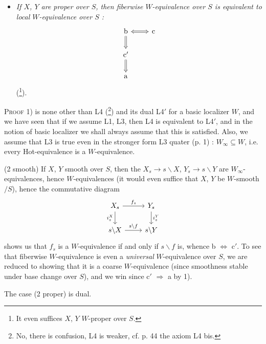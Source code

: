 \documentclass[11pt]{article}
\newcommand{\printedpage}[1]{\marginpar{\footnotesize p.~#1}}
\begin{document}
\begin{itemize}
\printedpage{26}
(\footnote[23]{it even suffices $X$, $Y$ $W$-smooth over $S$.}).

\item[(2 prop)] \textit{If $X$, $Y$ are proper over $S$, then fiberwise $W$-equivalence over $S$ is equivalent to local $W$-equivalence over $S$ :}
\[
\begin{tikzcd}
\text{b} \arrow[r, Leftrightarrow] \arrow[d, Rightarrow] & \text{c} \\
\text{c}' \arrow[d, Rightarrow] & \\
\text{a} &
\end{tikzcd}
\]
(\footnote[24]{It even suffices $X$, $Y$ $W$-proper over $S$.}).
\end{itemize}

\textsc{Proof} 1) is none other than L4 (\footnote[25]{No, there is confusion, L4 is weaker, cf. p. 44 the axiom L4 bis.}) and its dual L4$'$ for a basic localizer $W$, and we have seen that if we assume L1, L3, then L4 is equivalent to L4$'$, and in the notion of basic localizer we shall always assume that this is satisfied. Also, we assume that L3 is true even in the stronger form L3 quater (p. 1) : $W_\infty \subseteq W$, i.e. every Hot-equivalence is a $W$-equivalence.

(2 smooth) If $X$, $Y$ smooth over $S$, then the $X_s \longrightarrow s\backslash X$, $Y_s \longrightarrow s\backslash Y$ are $W_\infty$-equivalences, hence $W$-equivalences (it would even suffice that $X$, $Y$ be $W$-smooth$/S$), hence the commutative diagram
\[
\begin{tikzcd}
X_s \arrow[r, "f_s"] \arrow[d, "i_s^X"'] & Y_s \arrow[d, "i_s^Y"] \\
s\backslash X \arrow[r, "s\backslash f"] & s\backslash Y
\end{tikzcd}
\]
shows us that $f_s$ is a $W$-equivalence if and only if $s\backslash f$ is, whence b $\Longleftrightarrow$ c$'$. To see that fiberwise $W$-equivalence is even a \textit{universal} $W$-equivalence over $S$, we are reduced to showing that it is a coarse $W$-equivalence (since smoothness stable under base change over $S$), and we win since c$'$ $\Longrightarrow$ a by 1).

The case (2 proper) is dual.
\end{document}
